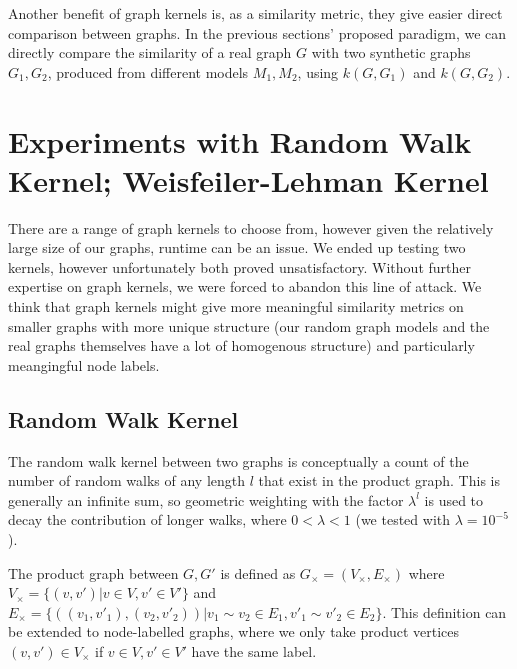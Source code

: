 Another benefit of graph kernels is, as a similarity metric, they give easier direct comparison between graphs.
In the previous sections' proposed paradigm, we can directly compare the similarity of a real graph $G$ with two synthetic graphs $G_1, G_2$, produced from different models $M_1, M_2$, using $k(G, G_1)$ and $k(G, G_2)$.







\section{Experiments with Random Walk Kernel; Weisfeiler-Lehman Kernel}
There are a range of graph kernels to choose from, however given the relatively large size of our graphs, runtime can be an issue. We ended up testing two kernels, however unfortunately both proved unsatisfactory. Without further expertise on graph kernels, we were forced to abandon this line of attack. We think that graph kernels might give more meaningful similarity metrics on smaller graphs with more unique structure (our random graph models and the real graphs themselves have a lot of homogenous structure) and particularly meangingful node labels.

\subsection{Random Walk Kernel}
The random walk kernel between two graphs is conceptually a count of the number of random walks of any length $l$ that exist in the product graph. This is generally an infinite sum, so geometric weighting with the factor $\lambda^l$ is used to decay the contribution of longer walks, where $0 < \lambda < 1$ (we tested with $\lambda=10^{-5}$).

The product graph between $G, G'$ is defined as $G_\times = (V_\times, E_\times)$ where $V_\times = \{(v, v') | v \in V, v' \in V'\}$ and $E_\times = \{((v_1, v'_1), (v_2, v'_2)) | v_1 \sim v_2 \in E_1, v'_1 \sim v'_2 \in E_2\}$. This definition can be extended to node-labelled graphs, where we only take product vertices $(v, v') \in V_\times$ if $v \in V, v' \in V'$ have the same label.

